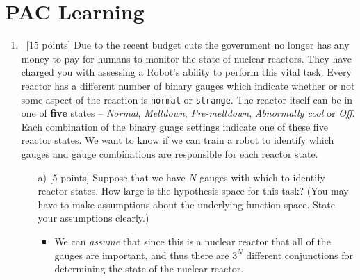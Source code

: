 \section{PAC Learning}
\label{sec:pac-learning}
\begin{enumerate}

\item ~[15 points] Due to the recent budget cuts the government no
  longer has any money to pay for humans to monitor the state of
  nuclear reactors. They have charged you with assessing a Robot's
  ability to perform this vital task. Every reactor has a different
  number of binary gauges which indicate whether or not some aspect of
  the reaction is {\tt normal} or {\tt strange}. The reactor itself
  can be in one of {\bf five} states -- {\em Normal}, {\em Meltdown},
  {\em Pre-meltdown}, {\em Abnormally cool} or {\em Off}. Each
  combination of the binary guage settings indicate one of these five
  reactor states. We want to know if we can train a robot to identify
  which gauges and gauge combinations are responsible for each reactor
  state.

  \begin{enumerate}
  \item [a)][5 points] Suppose that we have $N$ gauges with which to
    identify reactor states. How large is the hypothesis space for
    this task? (You may have to make assumptions about the underlying
    function space. State your assumptions clearly.)

\begin{itemize}
  \item We can {\em assume} that since this is a nuclear reactor that all of the gauges are important, and thus there are $3^{N}$ different conjunctions for determining the state of the nuclear reactor.%
\end{itemize}


\end{enumerate}
\end{enumerate}
